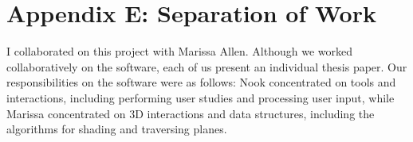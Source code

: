 \section{Appendix E: Separation of
Work}\label{appendix-e-separation-of-work}

I collaborated on this project with Marissa Allen. Although we worked
collaboratively on the software, each of us present an individual thesis
paper. Our responsibilities on the software were as follows: Nook
concentrated on tools and interactions, including performing user
studies and processing user input, while Marissa concentrated on 3D
interactions and data structures, including the algorithms for shading
and traversing planes.
